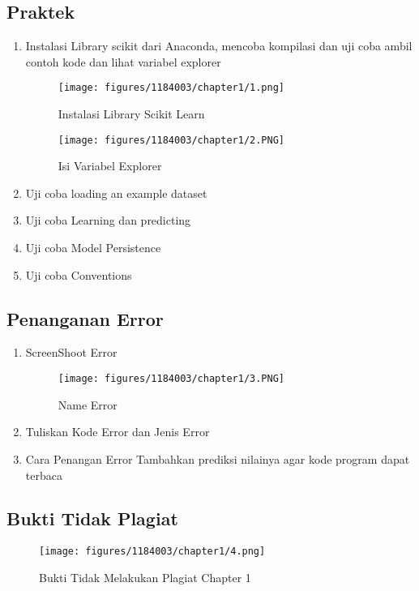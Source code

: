 \subsection{Praktek}
\begin{enumerate}
	\item Instalasi Library scikit dari Anaconda, mencoba kompilasi dan uji coba ambil contoh kode dan lihat variabel explorer
	\hfill\break
	\begin{figure}[h]
		\texttt{[image: figures/1184003/chapter1/1.png]}
		\centering
		\caption{Instalasi Library Scikit Learn}
	\end{figure}
	\begin{figure}[h]
		\texttt{[image: figures/1184003/chapter1/2.PNG]}
		\centering
		\caption{Isi Variabel Explorer}
	\end{figure}
	\newpage\item Uji coba loading an example dataset
	\hfill\break

\item Uji coba Learning dan predicting
	\hfill\break
	
\item Uji coba Model Persistence
	\hfill\break
		
	\item Uji coba Conventions
	\hfill\break
	
	\end{enumerate}
	\subsection{Penanganan Error}
\begin{enumerate}
	\item ScreenShoot Error
	\begin{figure}[h]
		\texttt{[image: figures/1184003/chapter1/3.PNG]}
		\centering
		\caption{Name Error}
	\end{figure}
	\newpage\item Tuliskan Kode Error dan Jenis Error
	\hfill\break
	
\hfill\break
	\item Cara Penangan Error
\hfill\break Tambahkan prediksi nilainya agar kode program dapat terbaca
	\end{enumerate}
	\subsection{Bukti Tidak Plagiat}
\begin{figure}[h]
	\texttt{[image: figures/1184003/chapter1/4.png]}
	\centering
	\caption{Bukti Tidak Melakukan Plagiat Chapter 1}
\end{figure}